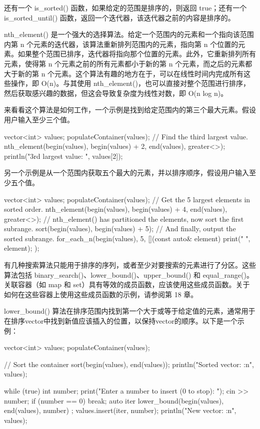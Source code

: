 还有一个 is\_sorted() 函数，如果给定的范围是排序的，则返回 true；还有一个 is\_sorted\_until() 函数，返回一个迭代器，该迭代器之前的内容是排序的。

nth\_element() 是一个强大的选择算法。给定一个范围内的元素和一个指向该范围内第 n 个元素的迭代器，该算法重新排列范围内的元素，指向第 n 个位置的元素。如果整个范围已排序，迭代器将指向那个位置的元素。此外，它重新排列所有元素，使得第 n 个元素之前的所有元素都小于新的第 n 个元素，而之后的元素都大于新的第 n 个元素。这个算法有趣的地方在于，可以在线性时间内完成所有这些操作，即 O(n)。与其使用 nth\_element()，也可以直接对整个范围进行排序，然后获取感兴趣的数据，但这会导致复杂度为线性对数，即 O(n log n)。

来看看这个算法是如何工作，一个示例是找到给定范围内的第三个最大元素。假设用户输入至少三个值。

\begin{cpp}
vector<int> values;
populateContainer(values);
// Find the third largest value.
nth_element(begin(values), begin(values) + 2, end(values), greater<>{});
println("3rd largest value: {}", values[2]);
\end{cpp}

另一个示例是从一个范围内获取五个最大的元素，并以排序顺序，假设用户输入至少五个值。

\begin{cpp}
vector<int> values;
populateContainer(values);
// Get the 5 largest elements in sorted order.
nth_element(begin(values), begin(values) + 4, end(values), greater<>{});
// nth_element() has partitioned the elements, now sort the first subrange.
sort(begin(values), begin(values) + 5);
// And finally, output the sorted subrange.
for_each_n(begin(values), 5, [](const auto& element) { print("{} ", element); });
\end{cpp}


有几种搜索算法只能用于排序的序列，或者至少对要搜索的元素进行了分区。这些算法包括 binary\_search()、lower\_bound()、upper\_bound() 和 equal\_range()。关联容器（如 map 和 set）具有等效的成员函数，应该使用这些成员函数。关于如何在这些容器上使用这些成员函数的示例，请参阅第 18 章。

lower\_bound() 算法在排序范围内找到第一个大于或等于给定值的元素，通常用于在排序vector中找到新值应该插入的位置，以保持vector的顺序。以下是一个示例：

\begin{cpp}
vector<int> values;
populateContainer(values);

// Sort the container
sort(begin(values), end(values));
println("Sorted vector: {:n}", values);

while (true) {
    int number;
    print("Enter a number to insert (0 to stop): ");
    cin >> number;
    if (number == 0) { break; }
    auto iter { lower_bound(begin(values), end(values), number) };
    values.insert(iter, number);
    println("New vector: {:n}", values);
}
\end{cpp}

